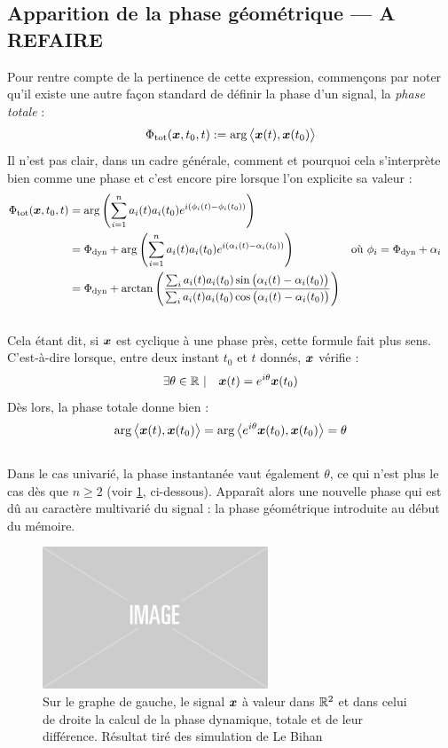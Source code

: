\subsection{Apparition de la phase géométrique --- A REFAIRE}\label{subsub:intro_phaseg}

Pour rentre compte de la pertinence de cette expression, commençons par noter qu'il existe une autre façon standard de définir la phase d'un signal, la \emph{phase totale} :
\begin{equation}\label{eq:phase_t}
	\Phi_{\text{\normalfont tot}}(\boldsymbol{x}, t_0, t) := \arg\big\langle \boldsymbol{x}(t), \boldsymbol{x}(t_0)\big\rangle
\end{equation}
Il n'est pas clair, dans un cadre générale, comment et pourquoi cela s'interprète bien comme une phase et c'est encore pire lorsque l'on explicite sa valeur :
\begin{align*}
	\Phi_{\text{\normalfont tot}}(\boldsymbol{x},t_0, t) &= \arg \left( \sum_{i=1}^n a_i(t)a_i(t_0)e^{i(\phi_i(t)-\phi_i(t_0))} \right) \\
	&= \Phi_{\text{\normalfont dyn}} + \arg \left( \sum_{i=1}^n a_i(t)a_i(t_0)e^{i(\alpha_i(t)-\alpha_i(t_0))} \right)  &  &\text{où } \phi_i = \Phi_{\text{\normalfont dyn}} + \alpha_i  \\
	&= \Phi_{\text{\normalfont dyn}} + \arctan \left( \frac{\sum_i a_i(t)a_i(t_0)\sin\big( \alpha_i(t)-\alpha_i(t_0)\big)}{\sum_i a_i(t)a_i(t_0)\cos\big( \alpha_i(t)-\alpha_i(t_0)\big)}  \right)
\end{align*}
\\

Cela étant dit, si $\boldsymbol{x}$ est cyclique à une phase près, cette formule fait plus sens. C'est-à-dire lorsque, entre deux instant $t_0$ et $t$ donnés, $\boldsymbol{x}$ vérifie :
\[\exists \theta\in\mathbb{R}\ |\quad \boldsymbol{x}(t) = e^{i\theta} \boldsymbol{x}(t_0)\]
Dès lors, la phase totale donne bien :
\[\arg\big\langle \boldsymbol{x}(t), \boldsymbol{x}(t_0)\big\rangle = \arg\big\langle e^{i\theta} \boldsymbol{x}(t_0), \boldsymbol{x}(t_0)\big\rangle = \theta\]
\\
Dans le cas univarié, la phase instantanée vaut également $\theta$, ce qui n'est plus le cas dès que $n\geq 2$ (voir \cref{fig:calc_diff_phases}, ci-dessous). Apparaît alors une nouvelle phase qui est dû au caractère multivarié du signal : la phase géométrique introduite au début du mémoire.
\\
\begin{figure}[h]
	\includegraphics[width=0.6\textwidth]{fig/placeholder}
	\caption{Sur le graphe de gauche, le signal $\boldsymbol{x}$ à valeur dans $\mathbb{R}^2$ et dans celui de droite la calcul de la phase dynamique, totale et de leur différence. Résultat tiré des simulation de Le Bihan \etal \cite{le_bihan_modephysiques_2023}}
	\label{fig:calc_diff_phases}
\end{figure}

